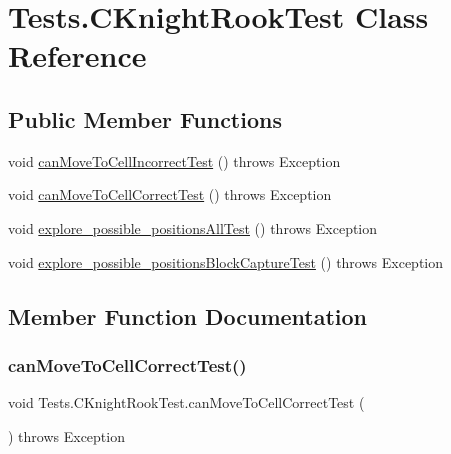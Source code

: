 \hypertarget{class_tests_1_1_c_knight_rook_test}{}\section{Tests.\+C\+Knight\+Rook\+Test Class Reference}
\label{class_tests_1_1_c_knight_rook_test}
\subsection*{Public Member Functions}
\begin{DoxyCompactItemize}
\item 
void \hyperlink{class_tests_1_1_c_knight_rook_test_aeaac63ecc2d7a359a7dbd50ccba581d0}{can\+Move\+To\+Cell\+Incorrect\+Test} ()  throws Exception 
\item 
void \hyperlink{class_tests_1_1_c_knight_rook_test_aaf2e223af58ebba13460dfd92892cff1}{can\+Move\+To\+Cell\+Correct\+Test} ()  throws Exception 
\item 
void \hyperlink{class_tests_1_1_c_knight_rook_test_a803bf9cf142b7ce8c59b8c500ce5e202}{explore\+\_\+possible\+\_\+positions\+All\+Test} ()  throws Exception 
\item 
void \hyperlink{class_tests_1_1_c_knight_rook_test_a3c50e04e4cb59f9cade207e7b79297d2}{explore\+\_\+possible\+\_\+positions\+Block\+Capture\+Test} ()  throws Exception 
\end{DoxyCompactItemize}


\subsection{Member Function Documentation}
\mbox{\label{class_tests_1_1_c_knight_rook_test_aaf2e223af58ebba13460dfd92892cff1}} 
\subsubsection{\texorpdfstring{can\+Move\+To\+Cell\+Correct\+Test()}{canMoveToCellCorrectTest()}}
{\footnotesize\ttfamily void Tests.\+C\+Knight\+Rook\+Test.\+can\+Move\+To\+Cell\+Correct\+Test (\begin{DoxyParamCaption}{ }\end{DoxyParamCaption}) throws Exception\hspace{0.3cm}{\ttfamily [inline]}}


